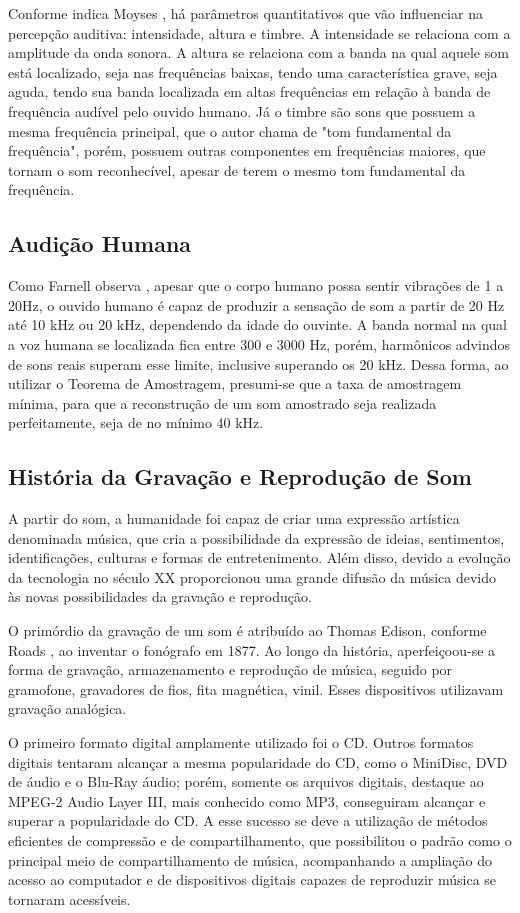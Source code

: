 Conforme indica Moyses \cite{moyses}, há parâmetros quantitativos que vão influenciar na percepção auditiva: intensidade, altura e timbre. A intensidade se relaciona com a amplitude da onda sonora. A altura se relaciona com a banda na qual aquele som está localizado, seja nas frequências baixas, tendo uma característica grave, seja aguda, tendo sua banda localizada em altas frequências em relação à banda de frequência audível pelo ouvido humano. Já o timbre são sons que possuem a mesma frequência principal, que o autor chama de "tom fundamental da frequência", porém, possuem outras componentes em frequências maiores, que tornam o som reconhecível, apesar de terem o mesmo tom fundamental da frequência.

\subsection{Audição Humana}
Como Farnell observa \cite{farnell}, apesar que o corpo humano possa sentir vibrações de 1 a 20Hz, o ouvido humano é capaz de produzir a sensação de som a partir de 20 Hz até 10 kHz ou 20 kHz, dependendo da idade do ouvinte. A banda normal na qual a voz humana se localizada fica entre 300 e 3000 Hz, porém, harmônicos advindos de sons reais superam esse limite, inclusive superando os 20 kHz.
Dessa forma, ao utilizar o Teorema de Amostragem, presumi-se que a taxa de amostragem mínima, para que a reconstrução de um som amostrado seja realizada perfeitamente, seja de no mínimo 40 kHz. 

\subsection{História da Gravação e Reprodução de Som}
A partir do som, a humanidade foi capaz de criar uma expressão artística denominada música, que cria a possibilidade da expressão de ideias, sentimentos, identificações, culturas e formas de entretenimento. Além disso, devido a evolução da tecnologia no século XX proporcionou uma grande difusão da música devido às novas possibilidades da gravação e reprodução. 
\par
O primórdio da gravação de um som é atribuído ao Thomas Edison, conforme Roads \cite{roads1996computer}, ao inventar o fonógrafo em 1877. Ao longo da história, aperfeiçoou-se a forma de gravação, armazenamento e reprodução de música, seguido por gramofone, gravadores de fios, fita magnética, vinil. Esses dispositivos utilizavam gravação analógica.
\par
O primeiro formato digital amplamente utilizado foi o CD. Outros formatos digitais tentaram alcançar a mesma popularidade do CD, como o MiniDisc, DVD de áudio e o Blu-Ray áudio; porém, somente os arquivos digitais, destaque ao MPEG-2 Audio Layer III, mais conhecido como MP3, conseguiram alcançar e superar a popularidade do CD. A esse sucesso se deve a utilização de métodos eficientes de compressão e de compartilhamento, que possibilitou o padrão como o principal meio de compartilhamento de música, acompanhando a ampliação do acesso ao computador e de dispositivos digitais capazes de reproduzir música se tornaram acessíveis.


